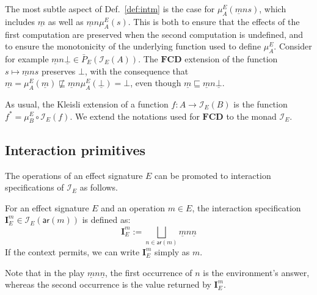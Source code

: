 \documentclass[sigplan,screen]{acmart}
\newcommand{\kw}[1]{\ensuremath{ \mathsf{#1} }}
\begin{document}
The most subtle aspect of Def.~\ref{def:intm}
is the case for $\mu^E_A(\underline{m} n s)$,
which includes $\underline{m}$ as well as $\underline{m} n \mu^E_A(s)$.
This is both
to ensure that the effects of the first computation are preserved
when the second computation is undefined, and
to ensure the monotonicity of the underlying function
used to define $\mu^E_A$.
Consider for example
$\underline{m} n \underline{\bot} \in \bar{P}_E(\mathcal{I}_E(A))$.
The $\mathbf{FCD}$ extension
of the function $s \mapsto \underline{m} n s$
preserves $\bot$,
with the consequence that
$\underline{m} = \mu^E_A(\underline{m}) \nsqsubseteq
 \underline{m} n \mu^E_A(\underline{\bot}) = \bot$,
even though
$\underline{m} \sqsubseteq \underline{m} n \underline{\bot}$.

As usual,
the Kleisli extension of a function $f : A \rightarrow \mathcal{I}_E(B)$
is the function $f^* = \mu^E_B \circ \mathcal{I}_E(f)$.
We extend the notations used for $\mathbf{FCD}$
to the monad $\mathcal{I}_E$.



\subsection{Interaction primitives} %

The operations of an effect signature $E$
can be promoted to interaction specifications of $\mathcal{I}_E$
as follows.

\begin{definition}
For an effect signature $E$ and
an operation $m \in E$,
the interaction specification
$\mathbf{I}_E^m \in \mathcal{I}_E(\kw{ar}(m))$
is defined as:
\[
  \mathbf{I}_E^m :=
    \bigsqcup_{n \in \kw{ar}(m)} \underline{m} n \underline{n}
\]
If the context permits,
we can write $\mathbf{I}_E^m$ simply as $m$.
\end{definition}
Note that in the play $\underline{m} n \underline{n}$,
the first occurrence of $n$ is the environment's answer,
whereas the second occurrence is the value returned by $\mathbf{I}_E^m$.
\end{document}
